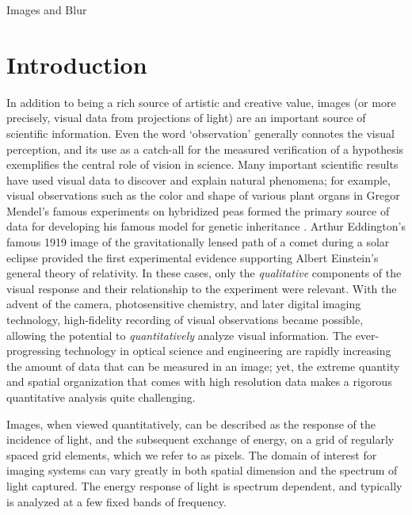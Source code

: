 \setlength{\parindent}{2ex}
\begin{chapter}{Images and Blur}\label{chapter:introduction}
  \section{Introduction}
  In addition to being a rich source of artistic and creative value, images (or more precisely, visual data from projections of light) are an important source of scientific information.
  Even the word `observation' generally connotes the visual perception, and its use as a catch-all for the measured verification of a hypothesis exemplifies the central role of vision in science.
  Many important scientific results have used visual data to discover and explain natural phenomena; for example, visual observations such as the color and shape of various plant organs in Gregor Mendel's famous experiments on hybridized peas formed the primary source of data for developing his famous model for genetic inheritance \citep{magner2002}.
  Arthur Eddington's famous 1919 image of the gravitationally lensed path of a comet during a solar eclipse \citep{eddington1920} provided the first experimental evidence supporting Albert Einstein's general theory of relativity.
  In these cases, only the \emph{qualitative} components of the visual response and their relationship to the experiment were relevant.
  With the advent of the camera, photosensitive chemistry, and later digital imaging technology, high-fidelity recording of visual observations became possible, allowing the potential to \emph{quantitatively} analyze visual information.
  The ever-progressing technology in optical science and engineering are rapidly increasing the amount of data that can be measured in an image; yet, the extreme quantity and spatial organization that comes with high resolution data makes a rigorous quantitative analysis quite challenging.

  Images, when viewed quantitatively, can be described as the response of the incidence of light, and the subsequent exchange of energy, on a grid of regularly spaced grid elements, which we refer to as pixels.
  The domain of interest for imaging systems can vary greatly in both spatial dimension and the spectrum of light captured. 
  The energy response of light is spectrum dependent, and typically is analyzed at a few fixed bands of frequency.


\end{chapter}
